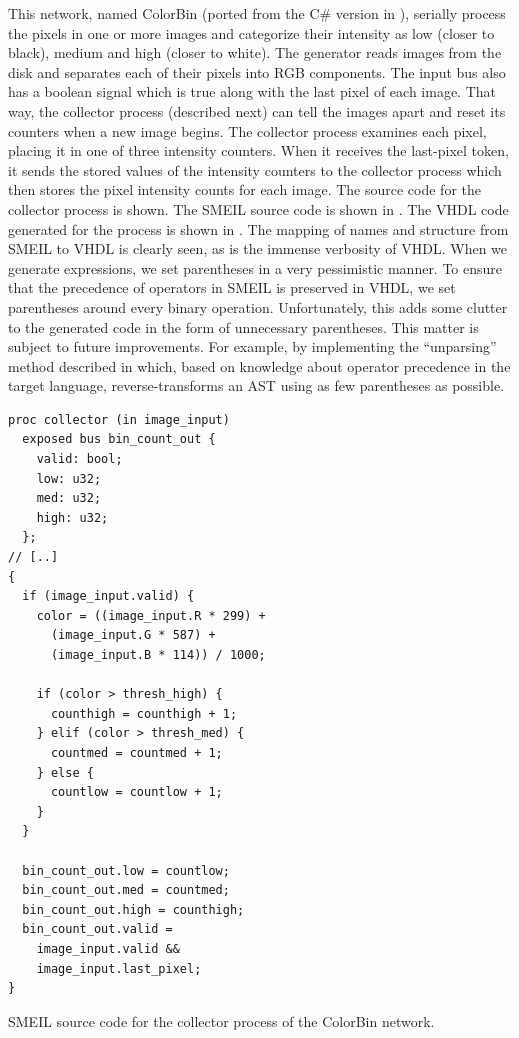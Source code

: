 This network, named ColorBin (ported from the C\# version in
\cite{skovhede2017c++}), serially process the pixels in one or more images and
categorize their intensity as low (closer to black), medium and high (closer to
white). The generator reads images from the disk and separates each of their
pixels into RGB components. The input bus also has a boolean signal which is
true along with the last pixel of each image. That way, the collector process
(described next) can tell the images apart and reset its counters when a new
image begins. The collector process examines each pixel, placing it in one of
three intensity counters. When it receives the last-pixel token, it sends the
stored values of the intensity counters to the collector process which then
stores the pixel intensity counts for each image. The source code for the
collector process is shown. The SMEIL source code is shown in
. The VHDL code generated for the process is shown in
. The mapping of names and structure from SMEIL to VHDL is
clearly seen, as is the immense verbosity of VHDL. When we generate expressions,
we set parentheses in a very pessimistic manner. To ensure that the precedence
of operators in SMEIL is preserved in VHDL, we set parentheses around every
binary operation. Unfortunately, this adds some clutter to the generated code in
the form of unnecessary parentheses. This matter is subject to future
improvements. For example, by implementing the ``unparsing'' method described in
\cite{ramsey1998unparsing} which, based on knowledge about operator precedence
in the target language, reverse-transforms an AST using as few parentheses as
possible.

\begin{widefigure}

\begin{lstlisting}[language=smeil,multicols=2]
proc collector (in image_input)
  exposed bus bin_count_out {
    valid: bool;
    low: u32;
    med: u32;
    high: u32;
  };
// [..]
{
  if (image_input.valid) {
    color = ((image_input.R * 299) +
      (image_input.G * 587) +
      (image_input.B * 114)) / 1000;

    if (color > thresh_high) {
      counthigh = counthigh + 1;
    } elif (color > thresh_med) {
      countmed = countmed + 1;
    } else {
      countlow = countlow + 1;
    }
  }

  bin_count_out.low = countlow;
  bin_count_out.med = countmed;
  bin_count_out.high = counthigh;
  bin_count_out.valid =
    image_input.valid &&
    image_input.last_pixel;
}
\end{lstlisting}
  \caption{SMEIL source code for the collector process of the ColorBin network.}
  \label{fig:collector}
\end{widefigure}

